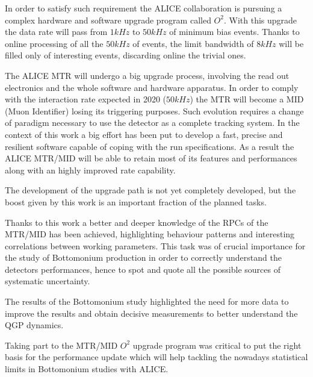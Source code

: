 In order to satisfy such requirement the ALICE collaboration is pursuing a complex hardware and software upgrade program called $O^2$.
With this upgrade the data rate will pass from $1kHz$ to $50 kHz$ of minimum bias events.
Thanks to online processing of all the $50 kHz$ of events, the limit bandwidth of $8kHz$ will be filled only of interesting events, discarding online the trivial ones.

The ALICE MTR will undergo a big upgrade process, involving the read out electronics and the whole software and hardware apparatus.
In order to comply with the interaction rate expected in 2020 ($50 kHz$) the MTR will become a MID (Muon Identifier) losing its triggering purposes.
Such evolution requires a change of paradigm necessary to use the detector as a complete tracking system.
In the context of this work a big effort has been put to develop a fast, precise and resilient software capable of coping with the run specifications.
As a result the ALICE MTR/MID will be able to retain most of its features and performances along with an highly improved rate capability.

The development of the upgrade path is not yet completely developed, but the boost given by this work is an important fraction of the planned tasks.


Thanks to this work a better and deeper knowledge of the RPCs of the MTR/MID has been achieved, highlighting behaviour patterns and interesting correlations between working parameters.
This task was of crucial importance for the study of Bottomonium production in order to correctly understand the detectors performances, hence to spot and quote all the possible sources of systematic uncertainty.

The results of the Bottomonium study highlighted the need for more data to improve the results and obtain decisive measurements to better understand the QGP dynamics.

Taking part to the MTR/MID $O^2$ upgrade program was critical to put the right basis for the performance update which will help tackling the nowadays statistical limits in Bottomonium studies with ALICE.


